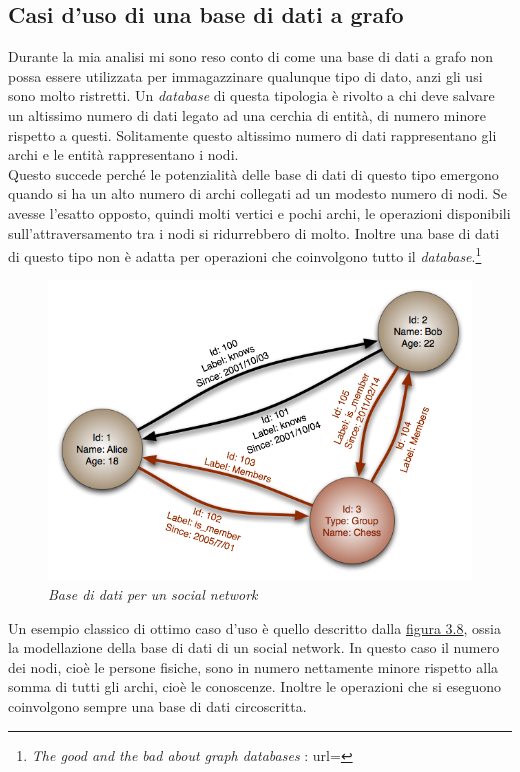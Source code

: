\subsection{Casi d'uso di una base di dati a grafo}
Durante la mia analisi mi sono reso conto di come una base di dati a grafo non possa essere utilizzata per immagazzinare qualunque tipo di dato, anzi gli usi sono molto ristretti. Un \textit{database} di questa tipologia è rivolto a chi deve salvare un altissimo numero di dati legato ad una cerchia di entità, di numero minore rispetto a questi. Solitamente questo altissimo numero di dati rappresentano gli archi e le entità rappresentano i nodi.\\
Questo succede perché le potenzialità delle base di dati di questo tipo emergono quando si ha un alto numero di archi collegati ad un modesto numero di nodi. Se avesse l'esatto opposto, quindi molti vertici e pochi archi, le operazioni disponibili sull'attraversamento tra i nodi si ridurrebbero di molto.
Inoltre una base di dati di questo tipo non è adatta per operazioni che coinvolgono tutto il \textit{database}.\footnote{\textit{The good and the bad about graph databases} : url= }
\label{fig:social}
\begin{figure}[!ht]
	\centering
	\includegraphics[scale=0.43]{immagini/social.png}
	\caption{\textit{Base di dati per un social network }}
\end{figure}
\newpage
Un esempio classico di ottimo caso d'uso è quello descritto dalla \hyperlink{fig:social}{figura 3.8}, ossia la modellazione della base di dati di un social network. In questo caso il numero dei nodi, cioè le persone fisiche, sono in numero nettamente minore rispetto alla somma di tutti gli archi, cioè le conoscenze. Inoltre le operazioni che si eseguono coinvolgono sempre una base di dati circoscritta.\\

